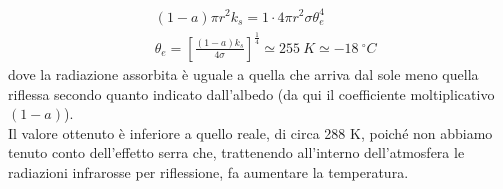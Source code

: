 \documentclass[
10pt, %
a4paper, %
oneside, %
headinclude,footinclude, %
BCOR5mm, %
]{scrartcl}
\begin{document}
\begin{exercise}
\begin{enumerate}
		\begin{align*}
			&(1-a)\pi r^2 k_s = 1\cdot 4 \pi r^2 \sigma \theta_e^4\\
			&\theta_e = \left[\frac{(1-a)k_s}{4\sigma}\right]^{\frac{1}{4}}\simeq 255\ K \simeq -18\ ^\circ C
		\end{align*}
		dove la radiazione assorbita è uguale a quella che arriva dal sole meno quella riflessa secondo quanto indicato dall'albedo (da qui il coefficiente moltiplicativo \((1-a)\)).\\
		Il valore ottenuto è inferiore a quello reale, di circa 288 \textdegree K, poiché non abbiamo tenuto conto dell'effetto serra che, trattenendo all'interno dell'atmosfera le radiazioni infrarosse per riflessione, fa aumentare la temperatura. 
	\end{enumerate}
\end{exercise}
\end{document}
